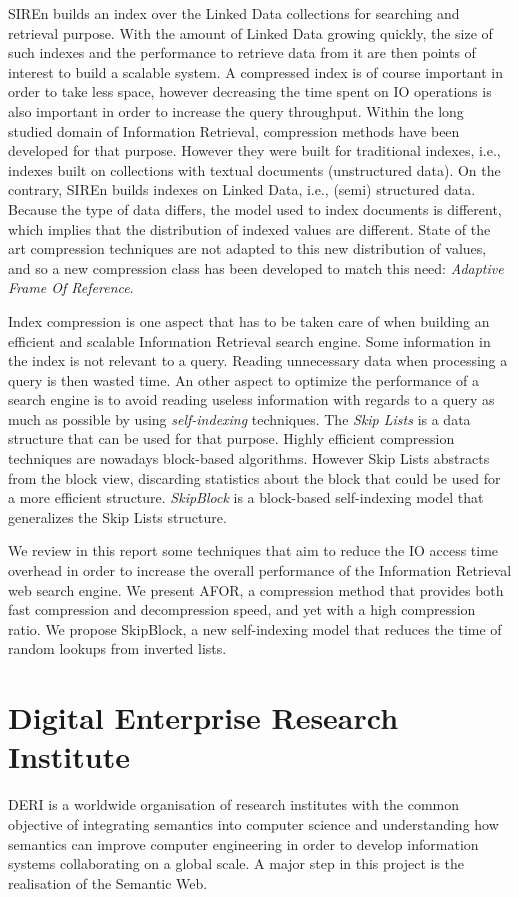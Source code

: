 {SIREn builds an index over the Linked Data collections for searching and
retrieval purpose. With the amount of Linked Data growing quickly, the size of
such indexes and the performance to retrieve data from it are then points of
interest to build a scalable system. A compressed index is of course important
in order to take less space, however decreasing the time spent on IO operations
is also important in order to increase the query throughput. Within the long
studied domain of Information Retrieval, compression methods have been
developed for that purpose. However they were built for traditional indexes,
i.e., indexes built on collections with textual documents (unstructured data). On
the contrary, SIREn builds indexes on Linked Data, i.e., (semi) structured
data. Because the type of data differs, the model used to index documents
is different, which implies that the distribution of indexed values are
different. State of the art compression techniques are not adapted to this new
distribution of values, and so a new compression class has been developed to
match this need: \emph{Adaptive Frame Of Reference}.
\linebreak

Index compression is one aspect that has to be taken care of when building an
efficient and scalable Information Retrieval search engine. Some information
in the index is not relevant to a query. Reading unnecessary data when
processing a query is then wasted time. An other aspect to optimize the
performance of a search engine is to avoid reading useless information with
regards to a query as much as possible by using \emph{self-indexing}
techniques. The \emph{Skip Lists} is a data structure that can be used for that
purpose. Highly efficient compression techniques are nowadays block-based
algorithms. However Skip Lists abstracts from the block view, discarding
statistics about the block that could be used for a more efficient structure.
\emph{SkipBlock} is a block-based self-indexing model that generalizes the
Skip Lists structure.

We review in this report some techniques that aim to reduce the IO access time
overhead in order to increase the overall performance of the Information
Retrieval web search engine. We present AFOR, a compression method that
provides both fast compression and decompression speed, and yet with a high
compression ratio. We propose SkipBlock, a new self-indexing model that
reduces the time of random lookups from inverted lists. }


\chapter{Digital Enterprise Research Institute} {
DERI is a worldwide organisation of research institutes with the common
objective of integrating semantics into computer science and understanding how
semantics can improve computer engineering in order to develop information
systems collaborating on a global scale. A major step in this project is the
realisation of the Semantic Web.
}
